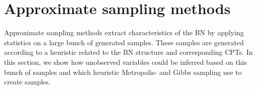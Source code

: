 \documentclass[a4paper, twoside, 11pt]{report}
\theoremstyle{plain}
\theoremstyle{definition}
\theoremstyle{remark}
\begin{document}



\section{Approximate sampling methods}\label{sec:approx-inf}
Approximate sampling methods extract characteristics of the BN by applying statistics on a large bunch of generated samples. These samples are generated according to a heuristic related to the BN structure and corresponding CPTs. In this section, we show how unobserved variables could be inferred based on this bunch of samples and which heuristic Metropolis- and Gibbs sampling use to create samples.\\ 
\end{document}
